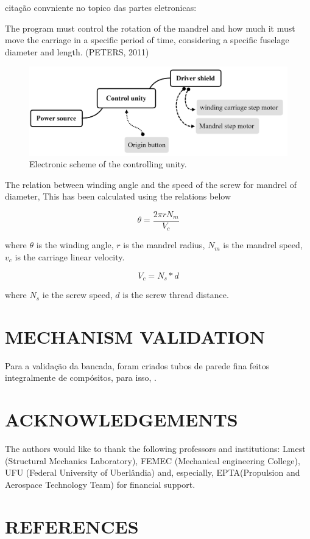 \documentclass[10pt,fleqn,a4paper,twoside]{article}
\begin{document}
citação convniente no topico das partes eletronicas:

The program must control the rotation of the mandrel and how much it must move the carriage in a specific period of time, considering a specific fuselage diameter and length. (PETERS, 2011)


\begin{figure}[!h]
	\centering
	\includegraphics[angle=0, trim = {0mm 0mm 0mm 0mm}, clip , scale=0.25]{imagens/eletronic}
	\caption{Electronic scheme of the controlling unity.}
	\label{i5}
\end{figure}

\citep{design_fiber} The relation between winding angle and the speed of the screw for mandrel of diameter, This has been calculated using the relations below

\begin{equation}
\theta = \frac{2\pi r N_m}{V_c}
\end{equation}

where $\theta$ is the winding angle, $r$ is the mandrel radius, $N_m$ is the mandrel speed, $v_c$ is the carriage linear velocity.


\begin{equation}
V_c = N_s * d
\end{equation}


where $N_s$ ie the screw speed, $d$ is the screw thread distance.




\section{MECHANISM VALIDATION}
Para a validação da bancada, foram criados tubos de parede fina feitos integralmente de compósitos, para isso, .







\section{ACKNOWLEDGEMENTS}
The authors would like to thank the following professors and institutions: Lmest (Structural Mechanics Laboratory), FEMEC (Mechanical engineering College), UFU (Federal University of Uberl\^andia) and, especially, EPTA(Propulsion and Aerospace Technology Team) for financial support.

\section{REFERENCES} 


\renewcommand{\refname}{}

\end{document}
